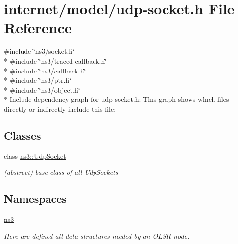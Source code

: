 \hypertarget{udp-socket_8h}{}\section{internet/model/udp-\/socket.h File Reference}
\label{udp-socket_8h}
{\ttfamily \#include \char`\"{}ns3/socket.\+h\char`\"{}}\\*
{\ttfamily \#include \char`\"{}ns3/traced-\/callback.\+h\char`\"{}}\\*
{\ttfamily \#include \char`\"{}ns3/callback.\+h\char`\"{}}\\*
{\ttfamily \#include \char`\"{}ns3/ptr.\+h\char`\"{}}\\*
{\ttfamily \#include \char`\"{}ns3/object.\+h\char`\"{}}\\*
Include dependency graph for udp-\/socket.h\+:
This graph shows which files directly or indirectly include this file\+:
\subsection*{Classes}
\begin{DoxyCompactItemize}
\item 
class \hyperlink{classns3_1_1UdpSocket}{ns3\+::\+Udp\+Socket}
\begin{DoxyCompactList}\small\item\em (abstract) base class of all Udp\+Sockets \end{DoxyCompactList}\end{DoxyCompactItemize}
\subsection*{Namespaces}
\begin{DoxyCompactItemize}
\item 
 \hyperlink{namespacens3}{ns3}
\begin{DoxyCompactList}\small\item\em Here are defined all data structures needed by an O\+L\+SR node. \end{DoxyCompactList}\end{DoxyCompactItemize}

